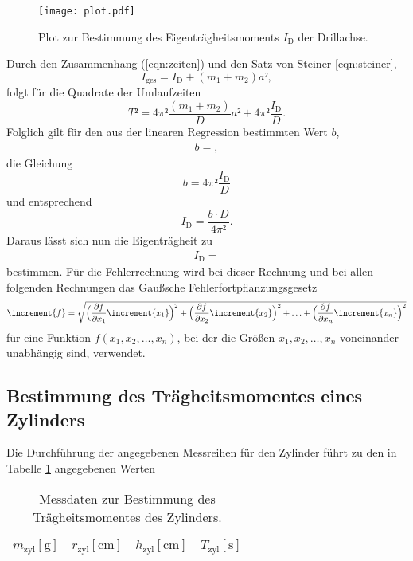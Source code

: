 \begin{figure}
  \centering
  \texttt{[image: plot.pdf]}
  \caption{Plot zur Bestimmung des Eigenträgheitsmoments $I_{\text{D}}$ der Drillachse.}
  \label{fig:plot}
\end{figure}

Durch den Zusammenhang (\ref{eqn:zeiten}) und den Satz von Steiner \eqref{eqn:steiner},
\begin{equation}
  I_{\text{ges}} = I_{\text{D}} + (m_1+m_2)a²,
\end{equation}
folgt für die Quadrate der Umlaufzeiten
\begin{equation}
  T² = 4\pi² \frac{(m_1+m_2)}{D}a² + 4\pi² \frac{I_{\text{D}}}{D}.
\end{equation}
Folglich gilt für den aus der linearen Regression bestimmten Wert $b$,
\begin{align*}
  b = ,
\end{align*}
die Gleichung
\begin{equation}
  b = 4\pi² \frac{I_{\text{D}}}{D}
\end{equation}
und entsprechend
\begin{equation}
  I_{\text{D}} = \frac{b \cdot D}{4\pi²}.
\end{equation}
Daraus lässt sich nun die Eigenträgheit zu
\begin{align*}
  I_{\text{D}} = 
\end{align*}
bestimmen.
Für die Fehlerrechnung wird bei dieser Rechnung und bei allen folgenden Rechnungen das Gaußsche Fehlerfortpflanzungsgesetz
\begin{equation}
\increment{f} = \sqrt{\Bigl(\frac{\partial f}{\partial x_1}\increment{x_1}\Bigr)^2 + \Bigl(\frac{\partial f}{\partial x_2}\increment{x_2}\Bigr)^2 + \dotsc + \Bigl(\frac{\partial f}{\partial x_n}\increment{x_n}\Bigr)^2}
\end{equation}
für eine Funktion $f(x_1,x_2, \dotsc ,x_n)$, bei der die Größen $x_1, x_2, \dotsc , x_n$ voneinander unabhängig sind, verwendet.

\subsection{Bestimmung des Trägheitsmomentes eines Zylinders}
Die Durchführung der angegebenen Messreihen für den Zylinder führt zu den in Tabelle \ref{tab:zyl} angegebenen Werten

\begin{table}[H]
  \centering
  \caption{Messdaten zur Bestimmung des Trägheitsmomentes des Zylinders.}
  \label{tab:zyl}
  \begin{tabular}{c c c c}
    \toprule
    {$m_\text{zyl} [\si{\gram}]$} & {$r_\text{zyl} [\si{\centi\metre}]$} & {$h_\text{zyl} [\si{\centi\metre}]$} & {$T_\text{zyl} [\si{\second}]$}\\
    \midrule
    
    \bottomrule
  \end{tabular}
\end{table}

